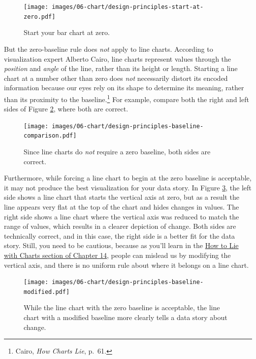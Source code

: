 \documentclass[
  english,
]{book}
\begin{document}
\begin{figure}
\centering
\texttt{[image: images/06-chart/design-principles-start-at-zero.pdf]}
\caption{\label{fig:design-principles-start-at-zero}Start your bar chart at zero.}
\end{figure}

But the zero-baseline rule does \emph{not} apply to line charts. According to visualization expert Alberto Cairo, line charts represent values through the \emph{position} and \emph{angle} of the line, rather than its height or length. Starting a line chart at a number other than zero does \emph{not} necessarily distort its encoded information because our eyes rely on its shape to determine its meaning, rather than its proximity to the baseline.\footnote{Cairo, \emph{How {Charts Lie}}, p.~61.} For example, compare both the right and left sides of Figure \ref{fig:design-principles-baseline-comparison}, where both are correct.



\begin{figure}
\centering
\texttt{[image: images/06-chart/design-principles-baseline-comparison.pdf]}
\caption{\label{fig:design-principles-baseline-comparison}Since line charts do \emph{not} require a zero baseline, both sides are correct.}
\end{figure}

Furthermore, while forcing a line chart to begin at the zero baseline is acceptable, it may not produce the best visualization for your data story. In Figure \ref{fig:design-principles-baseline-modified}, the left side shows a line chart that starts the vertical axis at zero, but as a result the line appears very flat at the top of the chart and hides changes in values. The right side shows a line chart where the vertical axis was reduced to match the range of values, which results in a clearer depiction of change. Both sides are technically correct, and in this case, the right side is a better fit for the data story. Still, you need to be cautious, because as you'll learn in the \href{how-to-lie-with-charts.html}{How to Lie with Charts section of Chapter 14}, people can mislead us by modifying the vertical axis, and there is no uniform rule about where it belongs on a line chart.



\begin{figure}
\centering
\texttt{[image: images/06-chart/design-principles-baseline-modified.pdf]}
\caption{\label{fig:design-principles-baseline-modified}While the line chart with the zero baseline is acceptable, the line chart with a modified baseline more clearly tells a data story about change.}
\end{figure}
\end{document}

